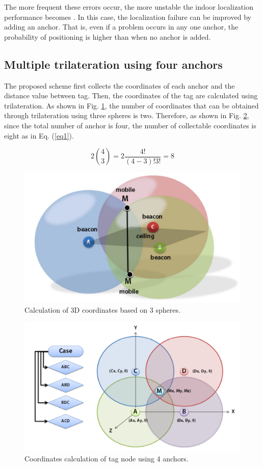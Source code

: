 \documentclass[conference]{IEEEtran}
\begin{document}
The more frequent these errors occur, the more unstable the indoor localization performance becomes \cite{b7}. In this case, the localization failure can be improved by adding an anchor. That is, even if a problem occurs in any one anchor, the probability of positioning is higher than when no anchor is added\cite{b8}.

\subsection{Multiple trilateration using four anchors}
The proposed scheme first collects the coordinates of each anchor and the distance value between tag. Then, the coordinates of the tag are calculated using trilateration. As shown in Fig. \ref{fig1}, the number of coordinates that can be obtained through trilateration using three spheres is two. Therefore, as shown in Fig. \ref{fig2}, since the total number of anchor is four, the number of collectable coordinates is eight as in Eq. (\ref{eq1}).

\begin{equation}
    2\binom{4}{3} = 2\frac{4!}{(4-3)!3!}=8\label{eq1}
\end{equation}

\begin{figure}[htbp]
    \centerline{\includegraphics[width=0.8\columnwidth]{fig2.png}}
    \caption{Calculation of 3D coordinates based on 3 spheres.}
    \label{fig1}
\end{figure}

\begin{figure}[htbp]
    \centerline{\includegraphics[width=0.9\columnwidth]{fig1.png}}
    \caption{Coordinates calculation of tag node using 4 anchors.}
    \label{fig2}
\end{figure}
\end{document}
